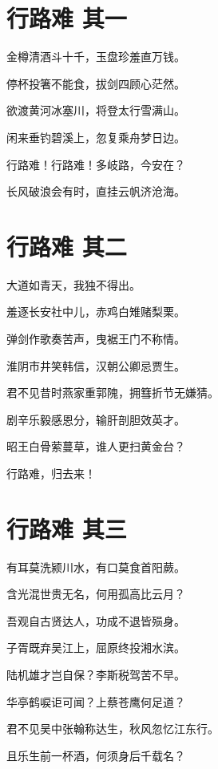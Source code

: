 \documentclass[12pt,a4paper]{ctexbook}
\begin{document}
	\chapter{行路难 其一}
	
	
	金樽清酒斗十千，玉盘珍羞直万钱。
	
	停杯投箸不能食，拔剑四顾心茫然。
	
	欲渡黄河冰塞川，将登太行雪满山。
	
	闲来垂钓碧溪上，忽复乘舟梦日边。
	
	行路难！行路难！多岐路，今安在？
	
	长风破浪会有时，直挂云帆济沧海。
	
	\chapter{行路难 其二}
	
	大道如青天，我独不得出。
	
	羞逐长安社中儿，赤鸡白雉赌梨栗。
	
	弹剑作歌奏苦声，曳裾王门不称情。
	
	淮阴市井笑韩信，汉朝公卿忌贾生。
	
	君不见昔时燕家重郭隗，拥篲折节无嫌猜。
	
	剧辛乐毅感恩分，输肝剖胆效英才。
	
	昭王白骨萦蔓草，谁人更扫黄金台？
	
	行路难，归去来！
	
	\chapter{行路难 其三}
	
	有耳莫洗颍川水，有口莫食首阳蕨。
	
	含光混世贵无名，何用孤高比云月？
	
	吾观自古贤达人，功成不退皆殒身。
	
	子胥既弃吴江上，屈原终投湘水滨。
	
	陆机雄才岂自保？李斯税驾苦不早。
	
	华亭鹤唳讵可闻？上蔡苍鹰何足道？
	
	君不见吴中张翰称达生，秋风忽忆江东行。
	
	且乐生前一杯酒，何须身后千载名？
\end{document}
